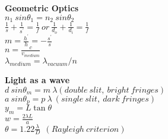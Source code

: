 \documentclass[12pt]{article}
\begin{document}
\begin{twocolumn}
\begin{flushleft}
{\bf Geometric Optics} \\
\bigskip
$\displaystyle n_1~ sin \theta_1 = n_2~ sin \theta_2$ \\
\medskip
$\displaystyle \frac{1}{s}+\frac{1}{s^{'}}=\frac{1}{f} \ or \ \frac{1}{d_o}+\frac{1}{d_i}=\frac{1}{f} $ \\
\medskip
$\displaystyle m = \frac{h^{'}}{h} = - \frac{s^{'}}{s}$ \\
\medskip
$\displaystyle n = \frac{c}{v_{medium}}$ \\
\medskip
$ \displaystyle \lambda_{medium}=\lambda_{vacuum}/n$ \\
\bigskip

{\bf Light as a wave} \\
\bigskip
$\displaystyle d ~sin \theta_m = m~ \lambda
(double\ slit,~bright~fringes)$ \\  
\medskip
$\displaystyle a ~sin \theta_p = p ~ \lambda~(single \ slit,
\ dark~fringes)$ \\ 
\medskip
$\displaystyle y_m = L \tan\theta$ \\
\medskip
$\displaystyle w = \frac{2\lambda L}{a}$ \\
\medskip
$\displaystyle \theta = 1.22 \frac{\lambda}{D}~~(Rayleigh~criterion)$ \\
\medskip






\end{flushleft}
\end{twocolumn}
\end{document}
